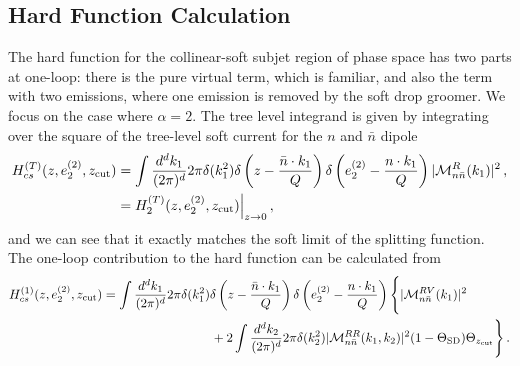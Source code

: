 \documentclass[a4paper,11pt]{article}
\newcommand{\nbar}{{\bar n}}
\newcommand{\ecf}[2]{e_{#1}^{(#2)}}
\newcommand{\nn}{\nonumber}
\def\zcut{z_{\text{cut}}}
\def\nbar{\bar n}
\begin{document}
\subsection{Hard Function Calculation}\label{app:hardfunc_sd}

The hard function for the collinear-soft subjet region of phase space has two parts at one-loop: there is the pure virtual term, which is familiar, and also the term with two emissions, where one emission is removed by the soft drop groomer. We focus on the case where $\alpha=2$. The tree level integrand is given by integrating over the square of the tree-level soft current for the $n$ and $\nbar$ dipole
{\small\begin{align} 
H_{cs}^{(T)}(z,\ecf{2}{2},\zcut) &= \int \frac{d^dk_1}{(2\pi)^d} 2\pi\delta(k_1^2)\delta\left(z-\frac{\nbar\cdot k_1}{Q}\right)\delta\left(\ecf{2}{2}-\frac{n\cdot k_1}{Q}\right)|{\cal M}^{R}_{n\nbar}(k_1)|^2\,, \nn\\
&=H_{2}^{(T)}(z,\ecf{2}{2},\zcut)\Big|_{z\rightarrow 0}\,,
\end{align}}
and we can see that it exactly matches the soft limit of the splitting function.
The one-loop contribution to the hard function can be calculated from
{\small\begin{align}\label{eq:one_loop_collinear_soft_subjets}
H_{cs}^{(1)}(z,\ecf{2}{2},\zcut) &= \int \frac{d^dk_1}{(2\pi)^d} 2\pi\delta(k_1^2)\delta\left(z-\frac{\nbar\cdot k_1}{Q}\right)\delta\left(\ecf{2}{2}-\frac{n\cdot k_1}{Q}\right)\Bigg\{|{\cal M}^{RV}_{n\nbar}(k_1)|^2\nonumber\nonumber\\
&\hspace{3cm}+2\int \frac{d^dk_2}{(2\pi)^d} 2\pi\delta(k_2^2) |{\cal M}^{RR}_{n\nbar}(k_1,k_2)|^2(1-\Theta_{\text{SD}})\Theta_{\zcut}\Bigg\}\,.
\end{align}}
\end{document}
